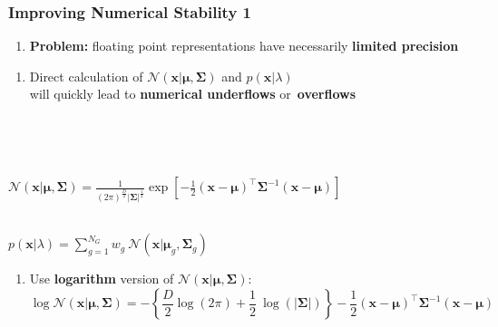\documentclass[usenames,dvipsnames]{beamer}
\def\Vec#1{{\boldsymbol{#1}}}
\def\Mat#1{{\boldsymbol{#1}}}
\begin{document}
\begin{frame}
\frametitle{Improving Numerical Stability 1}

\begin{enumerate}[{~~$\boldsymbol{\bullet}$}]

\item {\bf Problem:} floating point representations have necessarily {\bf limited precision}

\end{enumerate}

\begin{minipage}{1\textwidth}
\begin{minipage}{0.5\textwidth}
\begin{enumerate}[{~~$\boldsymbol{\bullet}$}]
\item Direct calculation of ${{\mathcal{N}}}( \Vec{x} | \Vec{\mu}, \Mat{\Sigma} )$ and $p(\Vec{x} | \lambda)$\\
will quickly lead to {\bf numerical underflows} or~{\bf overflows}
\end{enumerate}
\end{minipage}
\vline~
\begin{minipage}{0.45\textwidth}
~\\
\begin{tiny}
${{\mathcal{N}}}( \Vec{x} | \Vec{\mu}, \Mat{\Sigma} ) = \frac{1}{ (2\pi)^{\frac{D}{2}} | \Mat{\Sigma}|^{\frac{1}{2}} } \exp \left[ -\frac{1}{2} (\Vec{x}-\Vec{\mu})^\top \Mat{\Sigma}^{-1} (\Vec{x}-\Vec{\mu}) \right]$\\
\end{tiny}
~\\
$p(\Vec{x} | \lambda) = \sum\nolimits_{g=1}^{N_G} w_g ~ {{\mathcal{N}}}( \Vec{x} | \Vec{\mu}_g, \Mat{\Sigma}_g )$\\
\end{minipage}

\end{minipage}

\begin{enumerate}[{~~$\boldsymbol{\bullet}$}]

\item Use {\bf logarithm} version of ${{\mathcal{N}}}( \Vec{x} | \Vec{\mu}, \Mat{\Sigma} )$:
%
\begin{equation*}
  \log {{\mathcal{N}}}( \Vec{x} | \Vec{\mu}, \Mat{\Sigma} )
  = -\left\{\frac{D}{2} \log \left( 2\pi \right) + \frac{1}{2} ~ \log ( |\Mat{\Sigma}| ) \right\}
    -\frac{1}{2} (\Vec{x}-\Vec{\mu})^\top \Mat{\Sigma}^{-1} (\Vec{x}-\Vec{\mu})
\end{equation*}


\end{enumerate}
\end{frame}
\end{document}
